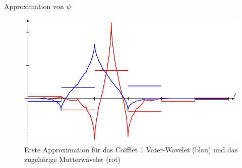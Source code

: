 \begin{loesung}
\begin{teilaufgaben}
Approximation von $\psi$
\end{teilaufgaben}
\begin{figure}
\centering
\includegraphics{chapters/uebungsaufgaben/07001-graph.pdf}
%
%
\caption{Erste Approximation für das Coifflet 1 Vater-Wavelet (blau)
und das zugehörige Mutterwavelet (rot)
\label{07001:coifletimage}}
\end{figure}
\end{loesung}


